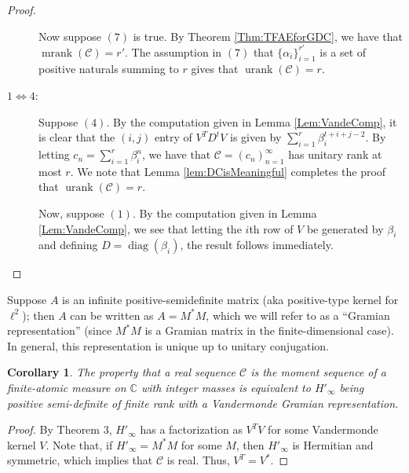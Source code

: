 \documentclass[12pt,reqno]{article}
\newtheorem{cor}{Corollary}
\DeclareMathOperator{\diag}{diag}
\DeclareMathOperator{\urank}{urank}
\DeclareMathOperator{\mrank}{mrank}
\begin{document}
\begin{proof}
\begin{description}
Now suppose $(7)$ is true. By Theorem \ref{Thm:TFAEforGDC}, we have that $\mrank(\mathcal{C}) = r'$. The assumption in $(7)$ that $\{\alpha_i\}_{i=1}^{r'}$ is a set of positive naturals summing to $r$ gives that $\urank(\mathcal{C}) = r$. 

\item[$1 \Leftrightarrow 4$:] Suppose $(4)$. By the computation given in Lemma \ref{Lem:VandeComp}, it is clear that the $(i,j)$ entry of $V^T D^t V$ is given by $\sum_{i=1}^r \beta_i^{t+i+j-2}$. By letting $c_n = \sum_{i=1}^r \beta_i^n$, we have that $\mathcal{C} = (c_n)_{n=1}^\infty$ has unitary rank at most $r$. We note that Lemma \ref{lem:DCisMeaningful} completes the proof that $\urank(\mathcal{C}) = r$. 

Now, suppose $(1)$. By the computation given in Lemma \ref{Lem:VandeComp}, we see that letting the $i$th row of $V$ be generated by $\beta_i$ and defining $D = \diag(\beta_i)$, the result follows immediately. 

\end{description}

\end{proof}

Suppose $A$ is an infinite positive-semidefinite matrix (aka positive-type kernel for $\ell^2$); then $A$ can be written as $A = M^\ast M$, which we will refer to as a ``Gramian representation'' (since $M^\ast M$ is a Gramian matrix in the finite-dimensional case). In general, this representation is unique up to unitary conjugation. 

\begin{cor}
The property that a real sequence $\mathcal{C}$ is the moment sequence of a finite-atomic measure on $\mathbb{C}$ with integer masses is equivalent to $H'_\infty$ being positive semi-definite of finite rank with a Vandermonde Gramian representation.
\end{cor}
\begin{proof}
By Theorem 3, $H'_\infty$ has a factorization as $V^T V$ for some Vandermonde kernel $V$.  Note that, if $H'_\infty = M^\ast M$ for some $M$, then $H'_\infty$ is Hermitian and symmetric, which implies that $\mathcal{C}$ is real.  Thus, $V^T = V^\ast$.
\end{proof}



\end{document}
